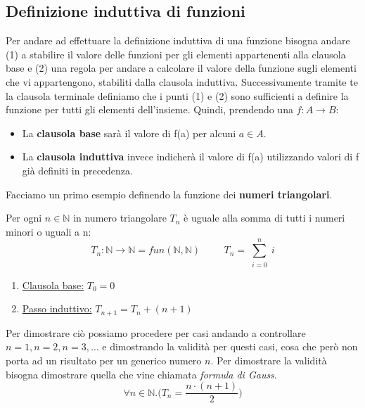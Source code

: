 \subsection{Definizione induttiva di funzioni}
Per andare ad effettuare la definizione induttiva di una funzione bisogna andare (1) a stabilire il valore delle funzioni per gli elementi appartenenti alla clausola base e (2) una regola per andare a calcolare il valore della funzione sugli elementi che vi appartengono, stabiliti dalla clausola induttiva. Successivamente tramite te la clausola terminale definiamo che i punti (1) e (2) sono sufficienti a definire la funzione per tutti gli elementi dell'insieme. Quindi, prendendo una $f: A \rightarrow B$:
\begin{itemize}
    \item La \textbf{clausola base} sarà il valore di f(a) per alcuni $a \in A$.
    \item La \textbf{clausola induttiva} invece indicherà il valore di f(a) utilizzando valori di f già definiti in precedenza.
\end{itemize}
\begin{example}
    Facciamo un primo esempio definendo la funzione dei \textbf{numeri triangolari}.
    \begin{definition}
        Per ogni $n \in \mathbb{N}$ in numero triangolare $T_n$ è uguale alla somma di tutti i numeri minori o uguali a n:
        \begin{equation}\label{numeri-triangolari}
            T_n: \mathbb{N} \rightarrow \mathbb{N} = fun(\mathbb{N},\mathbb{N}) \hspace{1cm} T_n = \sum_{\substack{i=0}}^n i
        \end{equation}
    \end{definition}
    \begin{enumerate}
        \item \underline{Clausola base:} $T_0 = 0$
        \item \underline{Passo induttivo:} $T_{n + 1} = T_n + (n + 1)$
    \end{enumerate}
    Per dimostrare ciò possiamo procedere per casi andando a controllare $n=1, n=2, n=3, \ldots$ e dimostrando la validità per questi casi, cosa che però non porta ad un risultato per un generico numero $n$. Per dimostrare la validità bisogna dimostrare quella che vine chiamata \textit{formula di Gauss}.
    \begin{equation}\label{formula-gauss}
        \forall n \in \mathbb{N} . \bigg(T_n = \frac{n \cdot (n + 1)}{2}\bigg)
    \end{equation}
\end{example}

